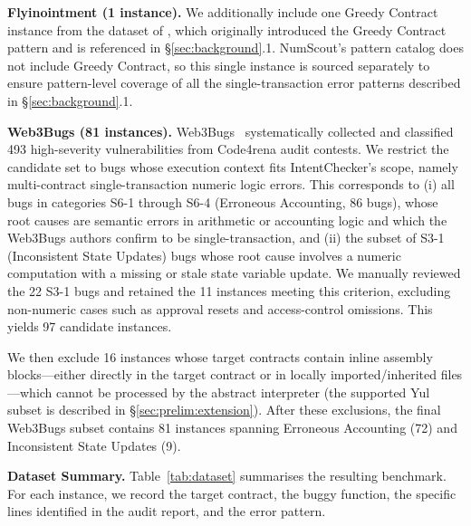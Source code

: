 \documentclass[pdflatex,sn-basic]{sn-jnl}%
\theoremstyle{thmstyleone}%
\theoremstyle{thmstyletwo}%
\theoremstyle{thmstylethree}%
\begin{document}
\smallskip\noindent\textbf{Flyinointment (1 instance).}
We additionally include one Greedy Contract instance from the dataset of \citet{flyinointment}, which originally introduced the Greedy Contract pattern and is referenced in §\ref{sec:background}.1.
NumScout's pattern catalog does not include Greedy Contract, so this single instance is sourced separately to ensure pattern-level coverage of all the single-transaction error patterns described in §\ref{sec:background}.1.

\smallskip\noindent\textbf{Web3Bugs (81 instances).}
Web3Bugs~\citep{exploitablebugs} systematically collected and classified 493 high-severity vulnerabilities from Code4rena audit contests.
We restrict the candidate set to bugs whose execution context fits IntentChecker's scope, namely multi-contract single-transaction numeric logic errors.
This corresponds to (i) all bugs in categories S6-1 through S6-4 (Erroneous Accounting, 86 bugs), whose root causes are semantic errors in arithmetic or accounting logic and which the Web3Bugs authors confirm to be single-transaction, and (ii) the subset of S3-1 (Inconsistent State Updates) bugs whose root cause involves a numeric computation with a missing or stale state variable update.
We manually reviewed the 22 S3-1 bugs and retained the 11 instances meeting this criterion, excluding non-numeric cases such as approval resets and access-control omissions.
This yields 97 candidate instances.

We then exclude 16 instances whose target contracts contain inline assembly blocks---either directly in the target contract or in locally imported/inherited files---which cannot be processed by the abstract interpreter (the supported Yul subset is described in §\ref{sec:prelim:extension}).
After these exclusions, the final Web3Bugs subset contains 81 instances spanning Erroneous Accounting (72) and Inconsistent State Updates (9).

\smallskip\noindent\textbf{Dataset Summary.}
Table~\ref{tab:dataset} summarises the resulting benchmark.
For each instance, we record the target contract, the buggy function, the specific lines identified in the audit report, and the error pattern.
\end{document}

